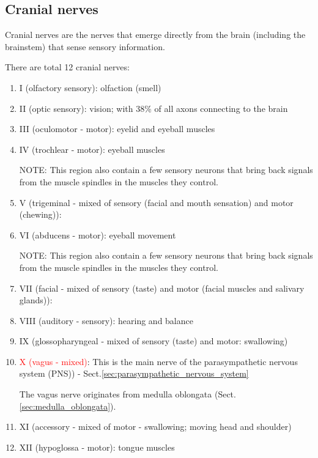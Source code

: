 \subsection{Cranial nerves}
\label{sec:cranial-nerve}

Cranial nerves are the nerves that emerge directly from the brain (including the
brainstem) that sense sensory information.

There are total 12 cranial nerves:
\begin{enumerate}
  \item I (olfactory sensory): olfaction (smell)
  
  \item II (optic sensory): vision; with 38\% of all axons connecting to the
  brain
  
  \item III (oculomotor - motor): eyelid and eyeball muscles
  
  \item IV (trochlear - motor): eyeball muscles
  
  NOTE: This region also contain a few sensory neurons that bring back signals
  from the muscle spindles in the muscles they control.
  
  \item V (trigeminal - mixed of sensory (facial and mouth sensation) and
  motor (chewing)): 
  
  \item VI (abducens - motor): eyeball movement
  
  NOTE: This region also contain a few sensory neurons that bring back signals
  from the muscle spindles in the muscles they control.
  
  \item VII (facial - mixed of sensory (taste) and motor (facial muscles and
  salivary glands)): 
  
  \item VIII (auditory - sensory): hearing and balance
  
  
  \item IX (glossopharyngeal - mixed of sensory (taste) and motor: swallowing)
  
\label{sec:vagus-nerve}
  \item \textcolor{red}{X (vagus - mixed)}: This is the main nerve of the 
  parasympathetic nervous system (PNS)) - Sect.\ref{sec:parasympathetic_nervous_system}

The vagus nerve originates from medulla oblongata
(Sect.\ref{sec:medulla_oblongata}).
  
  \item XI (accessory - mixed of motor - swallowing; moving head and shoulder)
  
  \item XII (hypoglossa - motor): tongue muscles
\end{enumerate}


